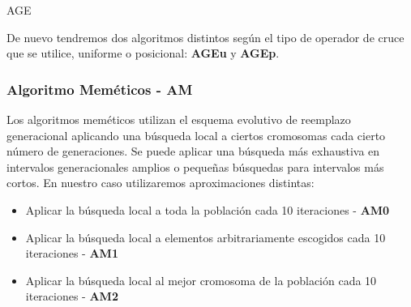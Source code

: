 \documentclass[11pt,a4paper]{article}
\begin{document}
	\begin{algorithm}[H]
		\caption{AGE}
	\end{algorithm}

	De nuevo tendremos dos algoritmos distintos según el tipo de operador de cruce que se utilice, uniforme o posicional: \textbf{AGEu} y \textbf{AGEp}.
	
	\subsubsection{ Algoritmo Meméticos - AM }
	
	Los algoritmos meméticos utilizan el esquema evolutivo de reemplazo generacional aplicando una búsqueda local a ciertos cromosomas cada cierto número de generaciones. Se puede aplicar una búsqueda más exhaustiva en intervalos generacionales amplios o pequeñas búsquedas para intervalos más cortos. En nuestro caso utilizaremos aproximaciones distintas:
	
	\begin{itemize}
		\item Aplicar la búsqueda local a toda la población cada 10 iteraciones - \textbf{AM0}
		\item Aplicar la búsqueda local a elementos arbitrariamente escogidos cada 10 iteraciones - \textbf{AM1}
		\item Aplicar la búsqueda local al mejor cromosoma de la población cada 10 iteraciones - \textbf{AM2}
	\end{itemize}
	
\end{document}
